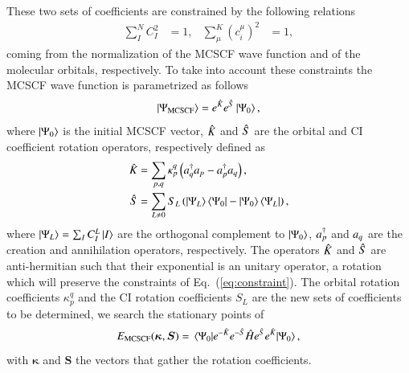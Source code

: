 \documentclass[aps,prb,reprint,showkeys,superscriptaddress]{revtex4-1}
\begin{document}
These two sets of coefficients are constrained by the following relations
\begin{align}
  \label{eq:constraint}
  \sum_I^N C^2_I &= 1, & \sum^K_\mu (c_i^\mu)^2 &= 1,
\end{align}
coming from the normalization of the MCSCF wave function and of the molecular orbitals, respectively.
To take into account these constraints the MCSCF wave function is parametrized as follows
\begin{equation}
  \label{eq:mcscf_wf}
  \ket{\Psi_{\text{MCSCF}}}=e^{\Hat{K}}e^{\Hat{S}}\ket{\Psi_0},
\end{equation}
where $\ket{\Psi_0}$ is the initial MCSCF vector, $\Hat{K}$ and $\Hat{S}$ are the orbital and CI coefficient rotation operators, respectively defined as
\begin{align}
  \Hat{K} &= \sum_{p,q} \kappa_p^q \left( a_{q}^\dagger a_{p} - a_{p}^\dagger a_{q} \right),  \\
  \Hat{S} &= \sum_{L \neq 0} S_{L}\left(\ket{\Psi_L}\bra{\Psi_0}-\ket{\Psi_0}\bra{\Psi_L}\right),
\end{align}
where $\ket{\Psi_{L}} = \sum_I C_I^L\ket{I} $ are the orthogonal complement to $\ket{\Psi_0}$, $a_{p}^\dagger$ and $a_{q}$ are the creation and annihilation operators, respectively.
The operators $\Hat{K}$ and $\Hat{S}$ are anti-hermitian such that their exponential is an unitary operator, \ie a rotation which will preserve the constraints of Eq.~(\ref{eq:constraint}).
The orbital rotation coefficients $\kappa_p^q$ and the CI rotation coefficients $S_{L}$ are the new sets of coefficients to be determined, \ie we search the stationary points of
\begin{equation}
  \label{eq:mcscf_nrj}
  E_{\text{MCSCF}}(\bm{\kappa},\bm{S}) = \mel{\Psi_0}{e^{-\Hat{K}}e^{-\Hat{S}} \Hat{H}e^{\Hat{S}}e^{\Hat{K}}}{\Psi_0},
\end{equation}
with $\bm{\kappa}$ and $\bm{S}$ the vectors that gather the rotation coefficients.
\end{document}
